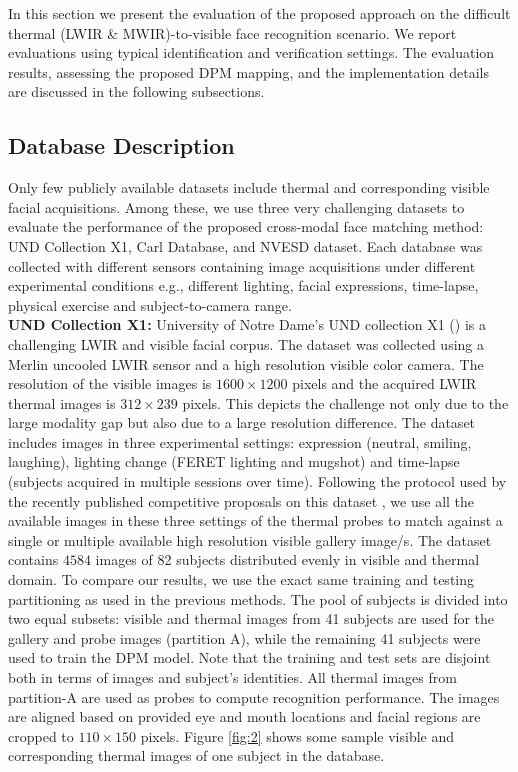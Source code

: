 \documentclass[smallextended,natbib]{svjour3}       \usepackage{graphicx}
\begin{document}
In this section we present the evaluation of the proposed approach on the difficult thermal (LWIR \& MWIR)-to-visible face recognition scenario. We report evaluations using typical identification and verification settings. The evaluation results, assessing the proposed DPM mapping, and the implementation details are discussed in the following subsections. 
\subsection{Database Description}
Only few publicly available datasets include thermal and corresponding visible facial acquisitions. Among these, we use three very challenging datasets to evaluate the performance of the proposed cross-modal face matching method: UND Collection X1, Carl Database, and NVESD dataset. Each database was collected with different sensors containing image acquisitions under different experimental conditions e.g., different lighting, facial expressions, time-lapse, physical exercise and subject-to-camera range.
\\[0.5\baselineskip]\noindent\textbf{UND Collection X1:} University of Notre Dame's UND collection X1 (\cite{chen2005ir}) is a challenging LWIR and visible facial corpus. The dataset was collected using a Merlin uncooled LWIR sensor and a high resolution visible color camera. The resolution of the visible images is $1600\times1200$ pixels and the acquired LWIR thermal images is $312\times239$ pixels. This depicts the challenge not only due to the large modality gap but also due to a large resolution difference. The dataset includes images in three experimental settings: expression (neutral, smiling, laughing), lighting change (FERET lighting and mugshot) and time-lapse (subjects acquired in multiple sessions over time). Following the protocol used by the recently published competitive proposals on this dataset \cite{hu2015, choi2012}, we use all the available images in these three settings of the thermal probes to match against a single or multiple available high resolution visible gallery image/s. The dataset contains $4584$ images of 82 subjects distributed evenly in visible and thermal domain. To compare our results, we use the exact same training and testing partitioning as used in the previous methods. The pool of subjects is divided into two equal subsets: visible and thermal images from 41 subjects are used for the gallery and probe images (partition A), while the remaining 41 subjects were used to train the DPM model. Note that the training and test sets are disjoint both in terms of images and subject's identities. All thermal images from partition-A are used as probes to compute recognition performance. The images are aligned based on provided eye and mouth locations and facial regions are cropped to $110\times150$ pixels. Figure \ref{fig:2} shows some sample visible and corresponding thermal images of one subject in the database.
\end{document}
